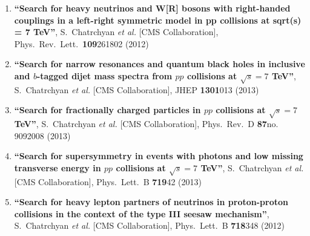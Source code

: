 \begin{enumerate}
\item%
{\bf ``Search for heavy neutrinos and W[R] bosons with right-handed couplings in a left-right symmetric model in pp collisions at sqrt(s) = 7 TeV''}, 
  S.~Chatrchyan {\it et al.}  [CMS Collaboration], 
Phys.\ Rev.\ Lett.\  {\bf 109}261802 (2012) %


\item%
{\bf ``Search for narrow resonances and quantum black holes in inclusive and $b$-tagged dijet mass spectra from $pp$ collisions at $\sqrt{s}=7$ TeV''}, 
  S.~Chatrchyan {\it et al.}  [CMS Collaboration], 
JHEP {\bf 1301}013 (2013) %


\item%
{\bf ``Search for fractionally charged particles in $pp$ collisions at $\sqrt{s}=7$ TeV''}, 
  S.~Chatrchyan {\it et al.}  [CMS Collaboration], 
Phys.\ Rev.\ D {\bf 87}no. 9092008 (2013) %


\item%
{\bf ``Search for supersymmetry in events with photons and low missing transverse energy in $pp$ collisions at $\sqrt{s}=7$ TeV''}, 
  S.~Chatrchyan {\it et al.}  [CMS Collaboration], 
Phys.\ Lett.\ B {\bf 719}42 (2013) %


\item%
{\bf ``Search for heavy lepton partners of neutrinos in proton-proton collisions in the context of the type III seesaw mechanism''}, 
  S.~Chatrchyan {\it et al.}  [CMS Collaboration], 
Phys.\ Lett.\ B {\bf 718}348 (2012) %



\end{enumerate}
